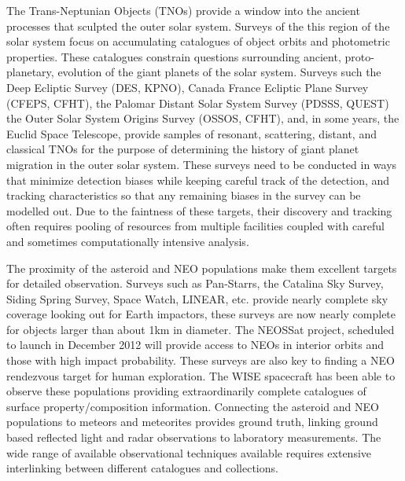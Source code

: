 The Trans-Neptunian Objects (TNOs) provide a window into the ancient processes that sculpted the outer solar system. Surveys of the this region of the solar system focus on accumulating catalogues of object orbits and photometric properties. These catalogues constrain questions surrounding ancient, proto-planetary, evolution of the giant planets of the solar system. Surveys such the Deep Ecliptic Survey (DES, KPNO),  Canada France Ecliptic Plane Survey (CFEPS, CFHT), the Palomar Distant Solar System Survey (PDSSS, QUEST)  the  Outer Solar System Origins Survey (OSSOS, CFHT),  and, in some years, the Euclid Space Telescope, provide samples of resonant, scattering, distant, and classical TNOs for the purpose of determining the history of giant planet migration in the outer solar system. These surveys need to be conducted in ways that minimize detection biases while keeping careful track of the detection, and tracking characteristics so that any remaining biases in the survey can be modelled out. Due to the faintness of these targets, their discovery and tracking often requires pooling of resources from multiple facilities coupled with careful and sometimes computationally intensive analysis.

The proximity of the asteroid and NEO populations make them excellent targets for detailed observation. Surveys such as Pan-Starrs, the Catalina Sky Survey, Siding Spring Survey, Space Watch, LINEAR, etc. provide nearly complete sky coverage looking out for Earth impactors, these surveys are now nearly complete for objects larger than about 1km in diameter. The NEOSSat project, scheduled to launch in December 2012 will provide access to NEOs in interior orbits and those with high impact probability. These surveys are also key to finding a NEO rendezvous target for human exploration. The WISE spacecraft has been able to observe these populations providing extraordinarily complete catalogues of surface property/composition information. Connecting the asteroid and NEO populations to meteors and meteorites provides ground truth, linking ground based reflected light and radar observations to laboratory measurements. The wide range of available observational techniques available requires extensive interlinking between different catalogues and collections.


